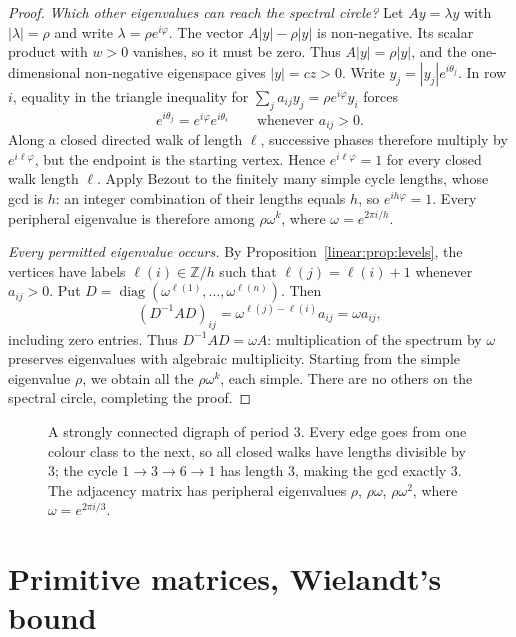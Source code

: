 \begin{proof}
\emph{Which other eigenvalues can reach the
spectral circle?}
Let $Ay=\lambda y$ with
$|\lambda|=\rho$ and write
$\lambda=\rho e^{i\varphi}$.
The vector $A|y|-\rho|y|$ is
non-negative. Its scalar product with
$w>0$ vanishes, so it must be zero.
Thus $A|y|=\rho|y|$, and the
one-dimensional non-negative
eigenspace gives $|y|=cz>0$.
Write $y_j=|y_j|e^{i\theta_j}$.
In row $i$, equality in the triangle
inequality for
$\sum_j a_{ij}y_j
=\rho e^{i\varphi}y_i$ forces
\[
e^{i\theta_j}
=e^{i\varphi}e^{i\theta_i}
\qquad\text{whenever }a_{ij}>0.
\]
Along a closed directed walk of
length $\ell$, successive phases
therefore multiply by $e^{i\ell\varphi}$,
but the endpoint is the starting
vertex. Hence $e^{i\ell\varphi}=1$
for every closed walk length $\ell$.
Apply Bezout to the finitely many simple cycle lengths, whose gcd is $h$:
an integer combination of their lengths equals $h$, so $e^{ih\varphi}=1$.
Every peripheral eigenvalue is
therefore among $\rho\omega^k$,
where $\omega=e^{2\pi i/h}$.

\emph{Every permitted eigenvalue occurs.}
By Proposition~\ref{linear:prop:levels},
the vertices have labels
$\ell(i)\in\mathbb Z/h$ such that
$\ell(j)=\ell(i)+1$ whenever
$a_{ij}>0$. Put
$D=\operatorname{diag}
 (\omega^{\ell(1)},\ldots,\omega^{\ell(n)})$.
Then
\[
(D^{-1}AD)_{ij}
=\omega^{\ell(j)-\ell(i)}a_{ij}
=\omega a_{ij},
\]
including zero entries. Thus
$D^{-1}AD=\omega A$: multiplication
of the spectrum by $\omega$ preserves
eigenvalues with algebraic multiplicity.
Starting from the simple eigenvalue
$\rho$, we obtain all the
$\rho\omega^k$, each simple.
There are no others on the spectral
circle, completing the proof.
\end{proof}

\begin{figure}[ht]
\centering
{}
\caption{A strongly connected digraph of period $3$. Every edge goes from one colour class to the next, so all closed walks
have lengths divisible by $3$; the cycle $1\to3\to6\to1$ has length $3$, making the gcd exactly $3$.
The adjacency matrix has peripheral eigenvalues $\rho$, $\rho\omega$, $\rho\omega^2$, where $\omega=e^{2\pi i/3}$.}
\label{linear:fig:period}
\end{figure}

\section{Primitive matrices, Wielandt's bound}

